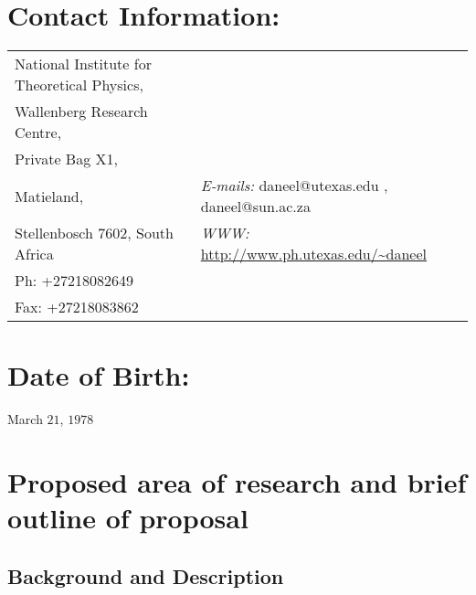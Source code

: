 \documentclass[a4paper,11pt,color]{article}
\begin{document}
\section{\sc Contact Information:		}
\vspace{.05in}
\begin{tabular}{@{}p{2.5in}p{4in}}

National Institute for Theoretical Physics, \\
Wallenberg Research Centre,\\
Private Bag X1, \\
Matieland,& {\it E-mails:}  daneel@utexas.edu , daneel@sun.ac.za\\
Stellenbosch $7602$, South Africa & {\it WWW:} \url{http://www.ph.utexas.edu/\~daneel}  \\
Ph: +27218082649 \\
Fax: +27218083862 \\
\end{tabular}
\section{\sc Date of Birth:			}
March $21$, $1978$
 
\section{\sc  Proposed area of research and brief outline of proposal}

\subsection{Background and Description }
\label{sec:sciTecQuality}
\end{document}
